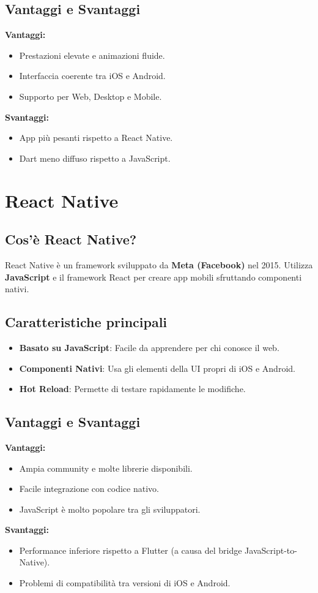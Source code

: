 \documentclass[a4paper,12pt]{article}
\begin{document}
\subsection{Vantaggi e Svantaggi}
\textbf{Vantaggi:}
\begin{itemize}
    \item Prestazioni elevate e animazioni fluide.
    \item Interfaccia coerente tra iOS e Android.
    \item Supporto per Web, Desktop e Mobile.
\end{itemize}
\textbf{Svantaggi:}
\begin{itemize}
    \item App più pesanti rispetto a React Native.
    \item Dart meno diffuso rispetto a JavaScript.
\end{itemize}

\section{React Native}
\subsection{Cos’è React Native?}
React Native è un framework sviluppato da \textbf{Meta (Facebook)} nel 2015. Utilizza \textbf{JavaScript} e il framework React per creare app mobili sfruttando componenti nativi.

\subsection{Caratteristiche principali}
\begin{itemize}
    \item \textbf{Basato su JavaScript}: Facile da apprendere per chi conosce il web.
    \item \textbf{Componenti Nativi}: Usa gli elementi della UI propri di iOS e Android.
    \item \textbf{Hot Reload}: Permette di testare rapidamente le modifiche.
\end{itemize}

\subsection{Vantaggi e Svantaggi}
\textbf{Vantaggi:}
\begin{itemize}
    \item Ampia community e molte librerie disponibili.
    \item Facile integrazione con codice nativo.
    \item JavaScript è molto popolare tra gli sviluppatori.
\end{itemize}
\textbf{Svantaggi:}
\begin{itemize}
    \item Performance inferiore rispetto a Flutter (a causa del bridge JavaScript-to-Native).
    \item Problemi di compatibilità tra versioni di iOS e Android.
\end{itemize}
\end{document}
